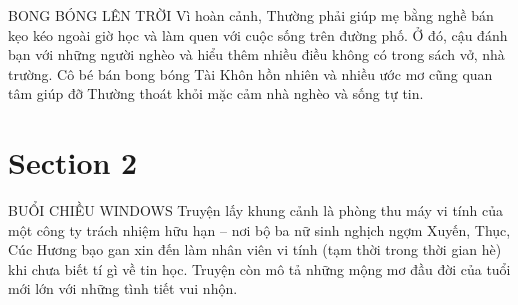 \documentclass{beamer}
\begin{document}
\begin{frame}{ BONG BÓNG LÊN TRỜI}
    Vì hoàn cảnh, Thường phải giúp mẹ bằng nghề bán kẹo kéo ngoài giờ học và làm quen với cuộc sống trên đường phố. Ở đó, cậu đánh bạn với những người nghèo và hiểu thêm nhiều điều không có trong sách vở, nhà trường. Cô bé bán bong bóng Tài Khôn hồn nhiên và nhiều ước mơ cũng quan tâm giúp đỡ Thường thoát khỏi mặc cảm nhà nghèo và sống tự tin.
\end{frame}
\section{Section 2}

\begin{frame}{ BUỔI CHIỀU WINDOWS}
    Truyện lấy khung cảnh là phòng thu máy vi tính của một công ty trách nhiệm hữu hạn – nơi bộ ba nữ sinh nghịch ngợm Xuyến, Thục, Cúc Hương bạo gan xin đến làm nhân viên vi tính (tạm thời trong thời gian hè) khi chưa biết tí gì về tin học. Truyện còn mô tả những mộng mơ đầu đời của tuổi mới lớn với những tình tiết vui nhộn.
\end{frame}
\end{document}
